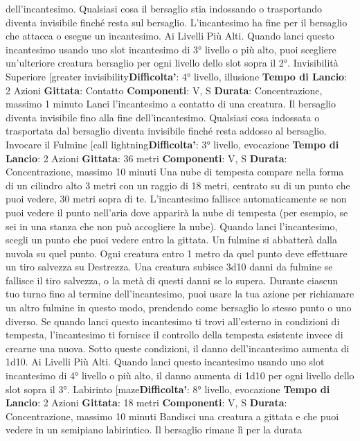 \begin{multicols}{2}
dell’incantesimo. Qualsiasi cosa il bersaglio stia
indossando o trasportando diventa invisibile finché
resta sul bersaglio. L’incantesimo ha fine per il
bersaglio che attacca o esegue un incantesimo.
Ai Livelli Più Alti. Quando lanci questo incantesimo
usando uno slot incantesimo di 3° livello o più alto, puoi
scegliere un’ulteriore creatura bersaglio per ogni livello
dello slot sopra il 2°.
Invisibilità Superiore
[greater invisibility\textbf{Difficolta'}:
4° livello, illusione
\textbf{Tempo di Lancio}: 2 Azioni
\textbf{Gittata}: Contatto
\textbf{Componenti}: V, S
\textbf{Durata}: Concentrazione, massimo 1 minuto
Lanci l’incantesimo a contatto di una creatura. Il
bersaglio diventa invisibile fino alla fine
dell’incantesimo. Qualsiasi cosa indossata o trasportata
dal bersaglio diventa invisibile finché resta addosso al
bersaglio.
Invocare il Fulmine
[call lightning\textbf{Difficolta'}:
3° livello, evocazione
\textbf{Tempo di Lancio}: 2 Azioni
\textbf{Gittata}: 36 metri
\textbf{Componenti}: V, S
\textbf{Durata}: Concentrazione, massimo 10 minuti
Una nube di tempesta compare nella forma di un
cilindro alto 3 metri con un raggio di 18 metri, centrato
su di un punto che puoi vedere, 30 metri sopra di te.
L’incantesimo fallisce automaticamente se non puoi
vedere il punto nell’aria dove apparirà la nube di
tempesta (per esempio, se sei in una stanza che non
può accogliere la nube).
Quando lanci l’incantesimo, scegli un punto che puoi
vedere entro la gittata. Un fulmine si abbatterà dalla
nuvola su quel punto. Ogni creatura entro 1 metro da
quel punto deve effettuare un tiro salvezza su
Destrezza. Una creatura subisce 3d10 danni da fulmine
se fallisce il tiro salvezza, o la metà di questi danni se lo
supera. Durante ciascun tuo turno fino al termine
dell’incantesimo, puoi usare la tua azione per
richiamare un altro fulmine in questo modo, prendendo
come bersaglio lo stesso punto o uno diverso.
Se quando lanci questo incantesimo ti trovi all’esterno
in condizioni di tempesta, l’incantesimo ti fornisce il
controllo della tempesta esistente invece di crearne una
nuova. Sotto queste condizioni, il danno
dell’incantesimo aumenta di 1d10.
Ai Livelli Più Alti. Quando lanci questo incantesimo
usando uno slot incantesimo di 4° livello o più alto, il
danno aumenta di 1d10 per ogni livello dello slot sopra
il 3°.
Labirinto
[maze\textbf{Difficolta'}:
8° livello, evocazione
\textbf{Tempo di Lancio}: 2 Azioni
\textbf{Gittata}: 18 metri
\textbf{Componenti}: V, S
\textbf{Durata}: Concentrazione, massimo 10 minuti
Bandisci una creatura a gittata e che puoi vedere in un
semipiano labirintico. Il bersaglio rimane lì per la durata

\end{multicols}

